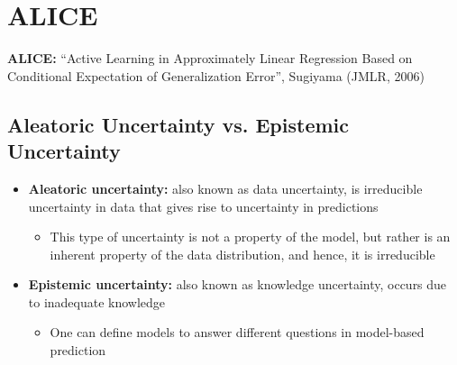 \documentclass[10pt]{article}
\begin{document}
\section*{ALICE}
\textbf{ALICE:} ``Active Learning in Approximately Linear Regression Based on Conditional Expectation of Generalization Error'', Sugiyama (JMLR, 2006)

\subsection*{Aleatoric Uncertainty vs. Epistemic Uncertainty}
\begin{itemize}
	\item \textbf{Aleatoric uncertainty:} also known as data uncertainty, is irreducible uncertainty in data that gives rise to uncertainty in predictions
	\begin{itemize}
	    \item This type of uncertainty is not a property of the model, but rather is an inherent property of the data distribution, and hence, it is irreducible
    \end{itemize}
    \item \textbf{Epistemic uncertainty:} also known as knowledge uncertainty, occurs due to inadequate knowledge
    \begin{itemize}
	    \item One can define models to answer different questions in model-based prediction
    \end{itemize}
\end{itemize}
\end{document}
